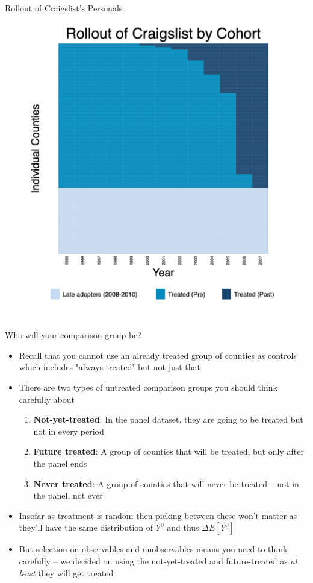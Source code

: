\documentclass{beamer}
\begin{document}
\begin{frame}{Rollout of Craigslist's Personals}
    \centering
    \includegraphics[width=\textwidth,height=0.95\textheight,keepaspectratio]{./lecture_includes/rollout.png}
\end{frame}

\begin{frame}{Who will your comparison group be?}

\begin{itemize}
\item Recall that you cannot use an already treated group of counties as controls which includes "always treated" but not just that
\item There are two types of untreated comparison groups you should think carefully about
	\begin{enumerate}
	\item \textbf{Not-yet-treated}: In the panel dataset, they are going to be treated but not in every period
	\item \textbf{Future treated}: A group of counties that will be treated, but only after the panel ends
	\item \textbf{Never treated}: A group of counties that will never be treated -- not in the panel, not ever
	\end{enumerate}
\item Insofar as treatment is random then picking between these won't matter as they'll have the same distribution of $Y^0$ and thus $\Delta E[Y^0]$
\item But selection on observables and unobservables means you need to think carefully -- we decided on using the not-yet-treated and future-treated as \emph{at least} they will get treated
\end{itemize}

\end{frame}
\end{document}
